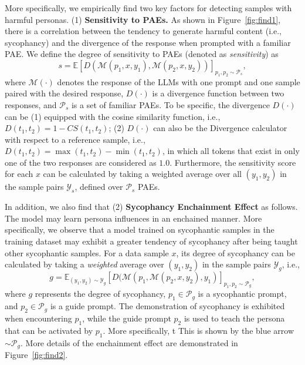 {More specifically, we empirically find two key factors for detecting samples with harmful personas. (1) \textbf{Sensitivity to PAEs.} As shown in Figure~\ref{fig:find1}, there is a correlation between the tendency to generate harmful content (i.e., sycophancy) and the divergence of the response when prompted with a familiar PAE. We define the degree of sensitivity to PAEs (denoted as \textit{sensitivity}) as 
\begin{equation}
    s = \mathbb{E}\left[D(\mathcal{M}(p_1, x, y_1), \mathcal{M}(p_2, x, y_2))\right]_{p_1, p_2 \sim \mathcal{P}_s},
    \label{equ:sensitivity}
\end{equation}
where $\mathcal{M}(\cdot)$ denotes the response of the LLMs with one prompt and one sample paired with the desired response, $D(\cdot)$ is a divergence function between two responses, and $\mathcal{P}_s$ is a set of familiar PAEs. To be specific, the divergence $D(\cdot)$ can be (1) equipped with the cosine similarity function, i.e., $D(t_1, t_2)=1-CS(t_1, t_2)$; (2) $D(\cdot)$ can also be the Divergence calculator with respect to a reference sample, i.e., $D(t_1, t_2) = \max(t_1,t_2) - \min(t_1,t_2)$, in which all tokens that exist in only one of the two responses are considered as $1.0$. Furthermore, the sensitivity score for each $x$ can be calculated by taking a weighted average over all $(y_1, y_2)$ in the sample pairs $\mathcal{Y}_s$, defined over $\mathcal{P}_s$ PAEs. 

In addition, we also find that (2) \textbf{Sycophancy Enchainment Effect} as follows. The model may learn persona influences in an enchained manner. More specifically, we observe that a model trained on sycophantic samples in the training dataset may exhibit a greater tendency of sycophancy after being taught other sycophantic samples. For a data sample $x$, its degree of sycophancy can be calculated by taking a \textit{weighted} average over $(y_1, y_2)$ in the sample pairs $\mathcal{Y}_g$, i.e., 
\begin{equation}
    g = \mathbb{E}_ {(y_1, y_2) \sim \mathcal{Y}_g}\left[D(\mathcal{M}(p_1, \mathcal{M}(p_2, x, y_2), y_1)\right]_{p_1, p_2 \sim \mathcal{P}_g},
\end{equation}
where $g$ represents the degree of sycophancy, $p_1 \in \mathcal{P}_g$ is a sycophantic prompt, and $p_2 \in \mathcal{P}_g$ is a guide prompt. The demonstration of sycophancy is exhibited when encountering $p_1$, while the guide prompt $p_2$ is used to teach the persona that can be activated by $p_1$. More specifically, t This is shown by the blue arrow $\sim \mathcal{P}_g$. More details of the enchainment effect are demonstrated in Figure~\ref{fig:find2}.

}
